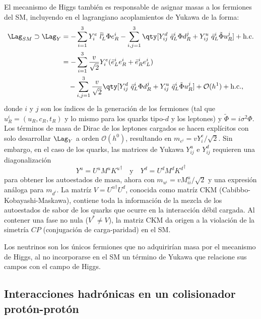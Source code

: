 El mecanismo de Higgs también es responsable de asignar masas a los fermiones del SM, incluyendo en el lagrangiano acoplamientos de Yukawa de la forma:
\begin{align*}
  \Lag_{SM} \supset \Lag_{Y} &= -\sum_{i = 1}^3 Y^e_{i} \ \bar{l}_L^i \Phi e_R^i -\sum_{i,j =1}^3 \qty[ Y_{ij}^d \ \bar{q}_L^i \Phi d^j_R + Y_{ij}^u \ \bar{q}_L^i \tilde{\Phi} u^j_R ] + \text{h.c.} \\
    &= -\sum_{i = 1}^3 \frac{v}{\sqrt{2}} Y^e_{i} (\bar{e}_L^i e_R^i + \bar{e}_R^i e_L^i) \\
    &\quad - \sum_{i,j =1}^3 \frac{v}{\sqrt{2}} \qty[ Y_{ij}^d \ \bar{q}_L^i \Phi d^j_R + Y_{ij}^u \ \bar{q}_L^i \tilde{\Phi} u^j_R ] + \mathcal{O}(h^1) + \text{h.c.},
\end{align*}
donde $i$ y $j$ son los índices de la generación de los fermiones (tal que $u^i_R = (u_R, c_R, t_R)$ y lo mismo para los quarks tipo-$d$ y los leptones) y $\tilde{\Phi} = i \sigma^2 \Phi$. Los términos de masa de Dirac de los leptones cargados se hacen explícitos con solo desarrollar $\Lag_Y$ a orden $\mathcal{O}(h^0)$, resultando en $m_{e^i} = v Y^e_i / \sqrt{2}$. Sin embargo, en el caso de los quarks, las matrices de Yukawa $Y^u_{ij}$ e $Y^d_{ij}$ requieren una diagonalización
\[ Y^u = U^u M^u {K^u}^\dagger \quad \text{y} \quad Y^d = U^d M^d {K^d}^\dagger \]
para obtener los autoestados de masa, ahora con $m_{u^i} = v M^u_{ii} /\sqrt{2}$ y una expresión análoga para $m_{d^i}$. La matríz $V = {U^u}^\dagger U^d$, conocida como matríz CKM (Cabibbo-Kobayashi-Maskawa), contiene toda la información de la mezcla de los autoestados de sabor de los quarks que ocurre en la interacción débil cargada. Al contener una fase no nula ($V^* \neq V$), la matriz CKM da origen a la violación de la simetría $CP$ (conjugación de carga-paridad) en el SM.

Los neutrinos son los únicos fermiones que no adquirirían masa por el mecanismo de Higgs, al no incorporarse en el SM un término de Yukawa que relacione sus campos con el campo de Higgs.










\subsection{Interacciones hadrónicas en un colisionador protón-protón} \label{sec:ch1:SM:had_interactions}

